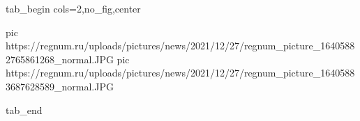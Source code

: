  
 
 
 
 

\ifcmt
  tab_begin cols=2,no_fig,center

     pic https://regnum.ru/uploads/pictures/news/2021/12/27/regnum_picture_16405882765861268_normal.JPG
		 pic https://regnum.ru/uploads/pictures/news/2021/12/27/regnum_picture_16405883687628589_normal.JPG

  tab_end
\fi
